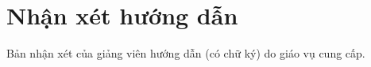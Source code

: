 \chapter*{Nhận xét hướng dẫn}
\label{thanks}

Bản nhận xét của giảng viên hướng dẫn (có chữ ký) do giáo vụ cung cấp.